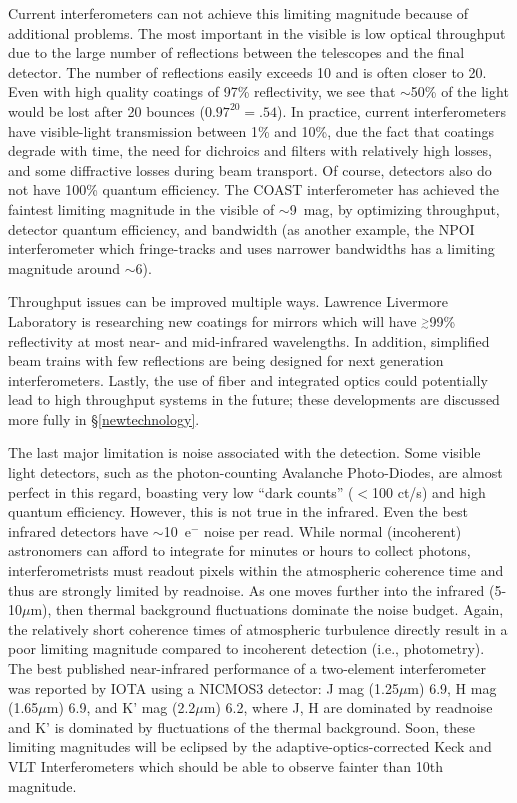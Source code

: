 \documentclass[12pt]{iopart}
\newcommand{\simge}{\mbox{$\stackrel{>}{_{\sim}}$}}
\begin{document}
Current interferometers can not achieve this
limiting magnitude because of additional problems.  The most important
in the visible is low optical throughput due to the large
number of reflections between the telescopes and the final detector.
The number of reflections easily exceeds 10 and is often closer to 20.
Even with high quality coatings of 97\% reflectivity, we see that
$\sim$50\% of the light would be lost after 20 bounces
($0.97^{20}=.54$).  In practice, current interferometers have
visible-light transmission between 1\% and 10\%, due the fact that
coatings degrade with time, the need for dichroics and filters with
relatively high losses, and some diffractive losses during beam
transport.  Of course, detectors also do not have 100\% quantum
efficiency.  The COAST interferometer has achieved the faintest
limiting magnitude in the visible of $\sim$9~mag, by optimizing
throughput, detector quantum efficiency, and bandwidth (as another
example, the NPOI interferometer which fringe-tracks and uses narrower
bandwidths has a limiting magnitude around $\sim$6).

Throughput issues can be improved multiple ways.
Lawrence Livermore Laboratory is researching new coatings for mirrors
which will have $\simge$99\% reflectivity at most near- and mid-infrared
wavelengths.  In addition, simplified beam trains with few
reflections are being designed for next generation interferometers.
Lastly, the use of fiber and integrated optics could potentially
lead to high throughput systems in the future; these developments are
discussed more fully in \S\ref{newtechnology}.

The last major limitation is noise associated with the detection.
Some visible light detectors, such as the photon-counting Avalanche
Photo-Diodes, are almost perfect in this regard, boasting very low
``dark counts'' ($<$100 ct/s) and high quantum efficiency. However,
this is not true in the infrared.  Even the best infrared detectors
have $\sim$10~e$^{-}$ noise per read. While normal (incoherent)
astronomers can afford to integrate for minutes or hours to collect
photons, interferometrists must readout pixels within the atmospheric
coherence time and thus are strongly limited by readnoise.  As one
moves further into the infrared (5-10$\mu$m), then thermal background
fluctuations dominate the noise budget.  Again, the relatively short
coherence times of atmospheric turbulence directly result in a poor
limiting magnitude compared to incoherent detection (i.e.,
photometry).  The best published near-infrared performance of a
two-element interferometer was reported by IOTA \citep{rmg1999b} using
a NICMOS3 detector: J mag (1.25$\mu$m) 6.9, H mag (1.65$\mu$m) 6.9,
and K' mag (2.2$\mu$m) 6.2, where J, H are dominated by readnoise and
K' is dominated by fluctuations of the thermal background.  Soon,
these limiting magnitudes will be eclipsed by the
adaptive-optics-corrected Keck and VLT Interferometers which should be
able to observe fainter than 10th magnitude.
\end{document}
